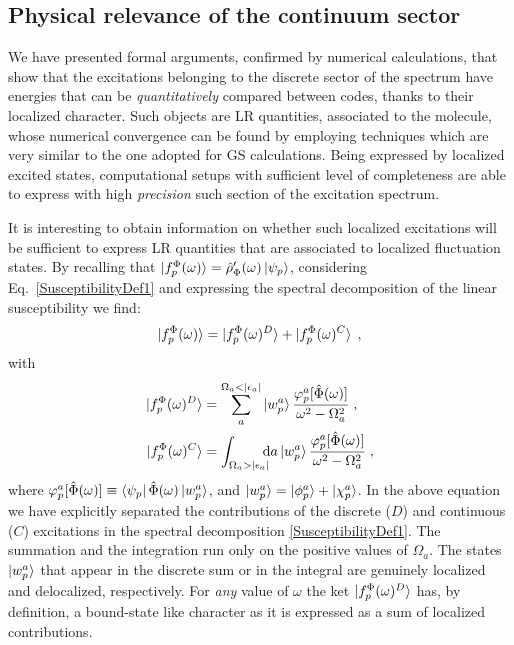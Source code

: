 \documentclass[reprint,aps,prb]{revtex4-1}
\newcommand{\dd}{{\rm d}}
\newcommand{\eps}{\epsilon}
\newcommand{\be}{\begin{equation}}
\newcommand{\ee}{\end{equation}}
\newcommand{\nn}{\notag}
\newcommand{\lb}{\label}
\newcommand{\op}[1]{\hat {#1}}
\newcommand{\dm}{\op{\rho}}
\newcommand{\fscd}[1]{\ket{f_p^\Phi(\omega)^{#1}}}
\begin{document}
\subsection{Physical relevance of the continuum sector}

We have presented formal arguments, confirmed by numerical calculations, that show that 
the excitations belonging to the discrete sector of the spectrum have energies
that can be \emph{quantitatively} compared between codes, thanks to their
localized character. 
Such objects are LR quantities, associated to the molecule, whose numerical convergence
can be found by employing techniques which are very similar to 
the one adopted for GS calculations. Being expressed by localized excited states,
computational setups with sufficient level of completeness are able to
express with high \emph{precision} such section of the excitation spectrum.

It is interesting to obtain information on whether such localized excitations
will be sufficient to express LR quantities that are associated to localized
fluctuation states.
By recalling that $\ket{f_p^\Phi(\omega)} = \dm'_\Phi(\omega) \ket{\psi_p}$,
considering Eq.~\eqref{SusceptibilityDef1} and
expressing the spectral decomposition of the linear susceptibility we find:
\be
\ket{f_p^\Phi(\omega)} = \fscd{D} + \fscd{C}
\lb{FSExcitationDef1} \;,
\ee
with
\begin{align}
 \fscd{D} &= \sum_a^{\Omega_a < |\eps_a|} \ket{w_p^a} \frac{\varphi_p^a[\op \Phi(\omega)]}{\omega^2-\Omega_a^2} \;, \nn \\
 \fscd{C}
 &= \int_{\Omega_a > |\eps_a|} \!\!\!\!\dd a \ket{w_p^a} \frac{\varphi_p^a[\op \Phi(\omega)]}{\omega^2-\Omega_a^2} \;, \nn
\end{align}
where $\varphi_p^a[\op \Phi(\omega)] \equiv \bra{\psi_p}\op\Phi(\omega)\ket{w_p^a}$,
and $\ket{w_p^a}=\ket{\phi_p^a}+\ket{\chi_p^a}$. 
In the above equation we have explicitly separated the contributions of the discrete ($D$) and continuous ($C$) excitations 
in the spectral decomposition \eqref{SusceptibilityDef1}.
The summation and the integration run only on the positive values of $\Omega_a$.
The states $\ket{w_p^a}$ that appear in the discrete sum 
or in the integral are genuinely localized and delocalized, respectively.
For \emph{any} value of $\omega$ the ket $\fscd{D}$ has, by definition, a bound-state like
character as it is expressed as a sum of localized contributions.
\end{document}
